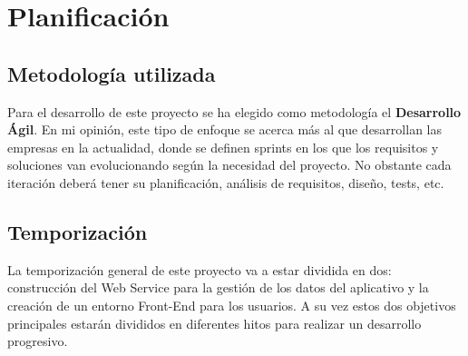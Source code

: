 \chapter{Planificación}

\section{Metodología utilizada}

Para el desarrollo de este proyecto se ha elegido como metodología el \textbf{Desarrollo Ágil}.
En mi opinión, este tipo de enfoque se acerca más al que desarrollan las empresas en la actualidad, donde se
definen sprints en los que los requisitos y soluciones van evolucionando según la necesidad del proyecto.
No obstante cada iteración deberá tener su planificación, análisis de requisitos, diseño, tests, etc.

\section{Temporización}

La temporización general de este proyecto va a estar dividida en dos: construcción del Web Service para la
gestión de los datos del aplicativo y la creación de un entorno Front-End para los usuarios. A su vez estos dos
objetivos principales estarán divididos en diferentes hitos para realizar un desarrollo progresivo.

